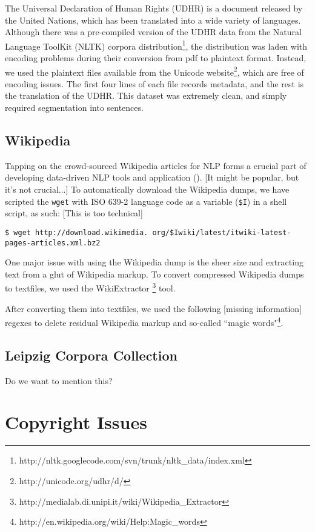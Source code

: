 \documentclass[11pt]{article}
\begin{document}
The Universal Declaration of Human Rights (UDHR) is a document released by the United Nations, which has been translated into a wide variety of languages. Although there was a pre-compiled version of the UDHR data from the Natural Language ToolKit (NLTK) corpora distribution\footnote{http://nltk.googlecode.com/svn/trunk/nltk\_data/index.xml}, the distribution was laden with encoding problems during their conversion from pdf to plaintext format. Instead, we used the plaintext files available from the Unicode website\footnote{http://unicode.org/udhr/d/}, which are free of encoding issues. The first four lines of each file records metadata, and the rest is the translation of the UDHR. This dataset was extremely clean, and simply required segmentation into sentences.

\subsection{Wikipedia}

Tapping on the crowd-sourced Wikipedia articles for NLP forms a crucial part of developing data-driven NLP tools and application ({\color{red}{citation neeeded}}). [It might be popular, but it's not crucial...] To automatically download the Wikipedia dumps, we have scripted the \texttt{wget} with ISO 639-2 language code as a variable (\texttt{\$I}) in a shell script, as such: [This is too technical]

\smallskip
\noindent \texttt{\$ wget http://download.wikimedia.
org/\$Iwiki/latest/itwiki-latest-
pages-articles.xml.bz2}
\medskip

\noindent One major issue with using the Wikipedia dump is the sheer size and extracting text from a glut of Wikipedia markup. To convert compressed Wikipedia dumps to textfiles, we used the WikiExtractor \footnote{http://medialab.di.unipi.it/wiki/Wikipedia\_Extractor} tool.

After converting them into textfiles, we used the following [missing information] regexes to delete residual Wikipedia markup and so-called ``magic words"\footnote{http://en.wikipedia.org/wiki/Help:Magic\_words}.

\subsection{Leipzig Corpora Collection}

Do we want to mention this?


\section{Copyright Issues} \label{sec:copyright}
\end{document}
